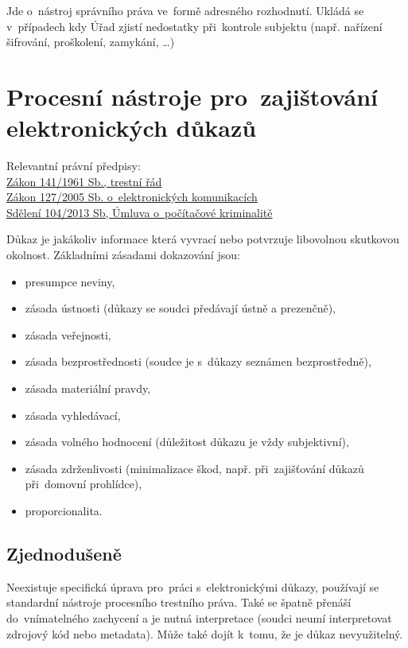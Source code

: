 Jde o~nástroj správního práva ve~formě adresného rozhodnutí.
Ukládá se v~případech kdy Úřad zjistí nedostatky při~kontrole subjektu (např. nařízení šifrování, proškolení, zamykání, \dots)


\clearpage
\section{Procesní nástroje pro~zajištování elektronických důkazů}

{}Relevantní právní předpisy:
\\\href{https://www.zakonyprolidi.cz/cs/1961-141}{Zákon 141/1961 Sb., trestní řád}
\\\href{https://www.zakonyprolidi.cz/cs/2005-127}{Zákon 127/2005 Sb. o~elektronických komunikacích}
\\\href{https://www.zakonyprolidi.cz/ms/2013-104}{Sdělení 104/2013 Sb, Úmluva o~počítačové kriminalitě}

Důkaz je jakákoliv informace která vyvrací nebo potvrzuje libovolnou skutkovou okolnost.
Základními zásadami dokazování jsou:
\vspace*{-1em}\begin{itemize}
\item presumpce neviny,
\item zásada ústnosti (důkazy se soudci předávají ústně a prezenčně),
\item zásada veřejnosti,
\item zásada bezprostřednosti (soudce je s~důkazy seznámen bezprostředně),
\item zásada materiální pravdy,
\item zásada vyhledávací,
\item zásada volného hodnocení (důležitost důkazu je vždy subjektivní),
\item zásada zdrženlivosti (minimalizace škod, např. při~zajišťování důkazů při~domovní prohlídce),
\item proporcionalita.
\end{itemize}

\subsection{Zjednodušeně}

Neexistuje specifická úprava pro~práci s~elektronickými důkazy, používají se standardní nástroje procesního trestního práva.
Také se špatně přenáší do~vnímatelného zachycení a je nutná interpretace (soudci neumí interpretovat zdrojový kód nebo metadata).
Může také dojít k~tomu, že je důkaz nevyužitelný.

